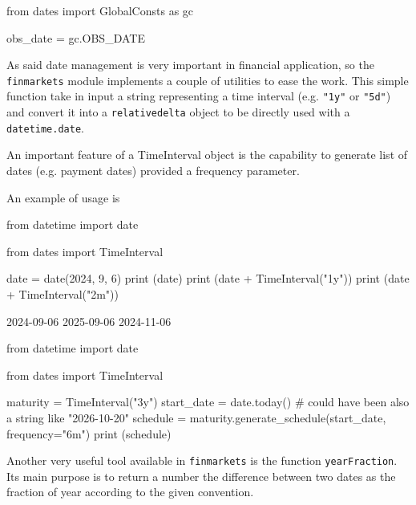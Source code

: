\begin{ipythonnon}
from dates import GlobalConsts as gc

obs_date = gc.OBS_DATE
\end{ipythonnon}

\begin{finmarkets}
As said date management is very important in financial application, so the \texttt{finmarkets} module implements a couple of utilities to ease the work.
This simple function take in input a string representing a time interval (e.g. \texttt{"1y"} or \texttt{"5d"}) and convert it into a \texttt{relativedelta} object to be directly used with a \texttt{datetime.date}.

An important feature of a TimeInterval object is the capability to generate list of dates (e.g. payment dates) provided a frequency parameter.
\end{finmarkets}

An example of usage is
\begin{ipythonnon}
from datetime import date

from dates import TimeInterval

date = date(2024, 9, 6)
print (date)
print (date + TimeInterval("1y"))
print (date + TimeInterval("2m"))
\end{ipythonnon}
\begin{ioutput}
2024-09-06
2025-09-06
2024-11-06
\end{ioutput}

\begin{ipythonnon}
from datetime import date

from dates import TimeInterval

maturity = TimeInterval("3y")
start_date = date.today() # could have been also a string like "2026-10-20"
schedule = maturity.generate_schedule(start_date, frequency="6m")
print (schedule)
\end{ipythonnon}
\begin{ioutput}
\end{ioutput}

\begin{finmarkets}
Another very useful tool available in \texttt{finmarkets} is the function \texttt{yearFraction}. Its main purpose is to return a number the difference between two dates as the fraction of year according to the given convention.
\end{finmarkets}


